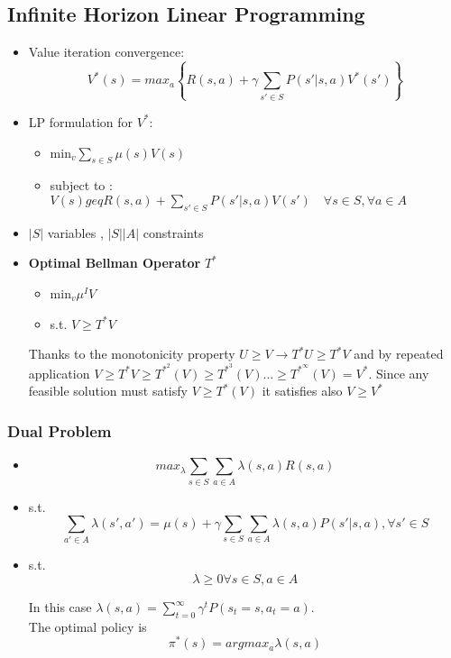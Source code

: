 \documentclass[12pt]{article} %
\begin{document}
\subsection{Infinite Horizon Linear Programming}
\begin{itemize}
\item Value iteration convergence: 
$$ V^{*}(s) = max_a\left\{  R(s,a) +\gamma \sum_{s' \in S}P(s'|s,a)V^*(s')  \right\}$$

\item LP formulation for $V^*$:
\begin{itemize}
\item min$_v \sum_{s \in S} \mu(s)V(s)$
\item subject to : $V(s) geq R(s,a)+ \sum_{s' \in S}P(s'|s,a)V(s') \quad \forall s \in S , \forall a \in A$ 
\end{itemize}
\item $|S|$ variables , $|S||A|$ constraints

\item \textbf{Optimal Bellman Operator} $T^*$ 
\begin{itemize}
\item min$_v \mu^I V$
\item s.t. $V \geq T^*V$
\end{itemize}
Thanks to the monotonicity property $ U \geq V \rightarrow T^*U \geq T^*V$ and by repeated application $V \geq T^*V \geq T^{*^2}(V) \geq T^{*^3}(V)... \geq T^{*^\infty}(V) = V^*$. Since any feasible solution must satisfy $V \geq T^*(V)$ it satisfies also $V \geq V^*$ 
\end{itemize}

\subsubsection{Dual Problem}
\begin{itemize}
\item $$max_{\lambda} \sum_{s \in S} \sum_{a \in A} \lambda(s,a)R(s,a)$$
\item s.t. $$\sum_{a' \in A} \lambda(s',a')= \mu(s) + \gamma \sum_{s \in S} \sum_{a \in A}\lambda(s,a)P(s'|s,a), \forall s' \in S$$
\item s.t. $$\lambda \geq 0  \forall s \in S , a \in A$$

In this case $\lambda(s,a) = \sum_{t=0}^{\infty} \gamma^tP(s_t=s,a_t=a)$.\\
The optimal policy is	
$$ \pi^* (s) = argmax_a \lambda(s,a)$$
\end{itemize}
\end{document}
